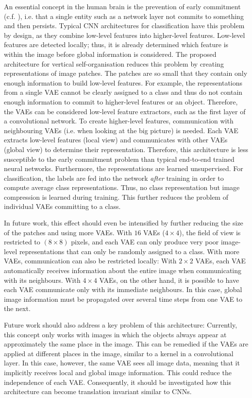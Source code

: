 An essential concept in the human brain is the prevention of early commitment  (c.f. ), i.e. that a single entity such as a network layer not commits to something and then persists. Typical CNN architectures for classification have this problem by design, as they combine low-level features into higher-level features. Low-level features are detected locally; thus, it is already determined which feature is within the image before global information is considered. The proposed architecture for vertical self-organisation reduces this problem by creating representations of image patches. The patches are so small that they contain only enough information to build low-level features. For example, the representations from a single VAE cannot be clearly assigned to a class and thus do not contain enough information to commit to higher-level features or an object. Therefore, the VAEs can be considered low-level feature extractors, such as the first layer of a convolutional network. To create higher-level features, communication with neighbouring VAEs (i.e. when looking at the big picture) is needed. Each VAE extracts low-level features (local view) and communicates with other VAEs (global view) to determine their representation. Therefore, this architecture is less susceptible to the early commitment problem than typical end-to-end trained neural networks.
Furthermore, the representations are learned unsupervised. For classification, the labels are fed into the network \emph{after} training in order to compute average class representations. Thus, no class representation but image compression is learned during training. This further reduces the problem of individual VAEs committing to a class.

In future work, this effect should even be intensified by further reducing the size of the patches and using more VAEs. With $16$ VAEs ($4\times4$), the field of view is restricted to $(8 \times 8)$ pixels, and each VAE can only produce very poor image-level representations that can only be randomly assigned to a class. With more VAEs, communication can also be restricted locally: With $2\times2$ VAEs, each VAE automatically receives information about the entire image when communicating with its neighbours. With $4\times4$ VAEs, on the other hand, it is possible to have each VAE communicate only with its immediate neighbours. In this case, global image information must be propagated over several time steps from one VAE to the next.

Future work should also address a key problem of this architecture: Currently, this concept only works with images in which the objects always appear at approximately the same place in the image. This can be remedied if the VAEs are applied at different places in the image, similar to a kernel in a convolutional layer. In this case, however, the same VAE sees all image data, meaning that it implicitly receives local and global image information. This could reduce the independence of each VAE. Consequently, it should be investigated how this architecture can become translation invariant similar to CNNs.


